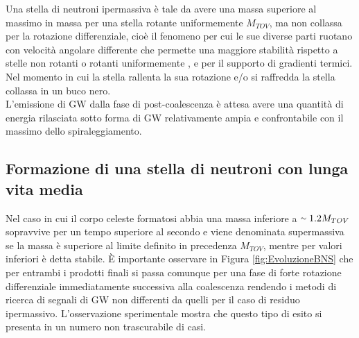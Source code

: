 Una stella di neutroni ipermassiva è tale da avere una massa superiore al massimo in massa per una stella rotante uniformemente $M_{TOV}$, ma non collassa per la rotazione differenziale, cioè il fenomeno per cui le sue diverse parti ruotano con velocità angolare differente che permette una maggiore stabilità rispetto a stelle non rotanti o rotanti uniformemente \cite{Baumgarte_2000}, e per il supporto di gradienti termici.
Nel momento in cui la stella rallenta la sua rotazione e/o si raffredda  la stella collassa in un buco nero. \\
%
L'emissione di GW dalla fase di post-coalescenza è attesa avere una quantità di energia rilasciata sotto forma di GW relativamente ampia e confrontabile con il massimo dello spiraleggiamento\cite{sarin2020evolution}. 

\subsection{Formazione di una stella di neutroni con lunga vita media}
\label{subsection:long_lived}
Nel caso in cui il corpo celeste formatosi abbia una massa inferiore a $\smallsim1.2M_{TOV}$ sopravvive per un tempo superiore al secondo e viene denominata supermassiva se la massa è superiore al limite definito in precedenza $M_{TOV}$, mentre per valori inferiori è detta stabile.
È importante osservare in Figura \ref{fig:EvoluzioneBNS} che per entrambi i prodotti finali si passa comunque per una fase di forte rotazione differenziale immediatamente successiva alla coalescenza rendendo i metodi di ricerca di segnali di GW non differenti da quelli per il caso di residuo ipermassivo.
L'osservazione sperimentale mostra che questo tipo di esito si presenta in un numero non trascurabile di casi\cite{sarin2020evolution}.

